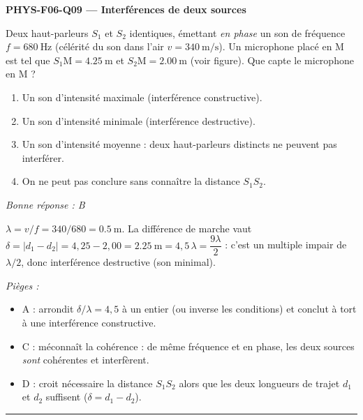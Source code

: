 \documentclass[11pt,a4paper]{article}
\begin{document}
\noindent\textbf{PHYS-F06-Q09 --- Interférences de deux sources}\par
Deux haut-parleurs $S_1$ et $S_2$ identiques, émettant \emph{en phase} un son de fréquence $f = \qty{680}{\hertz}$ (célérité du son dans l'air $v = \qty{340}{\metre\per\second}$). Un microphone placé en M est tel que $S_1\text{M} = \qty{4.25}{\metre}$ et $S_2\text{M} = \qty{2.00}{\metre}$ (voir figure). Que capte le microphone en M ?
\begin{center}
\end{center}
\begin{enumerate}[label=\Alph*)]
\item Un son d'intensité maximale (interférence constructive).
\item Un son d'intensité minimale (interférence destructive).
\item Un son d'intensité moyenne : deux haut-parleurs distincts ne peuvent pas interférer.
\item On ne peut pas conclure sans connaître la distance $S_1S_2$.
\end{enumerate}
\textit{Bonne réponse : B}\par
$\lambda = v/f = 340/680 = \qty{0.5}{\metre}$. La différence de marche vaut $\delta = |d_1 - d_2| = 4{,}25 - 2{,}00 = \qty{2.25}{\metre} = 4{,}5\,\lambda = \dfrac{9\lambda}{2}$ : c'est un multiple impair de $\lambda/2$, donc interférence destructive (son minimal).\par
\textit{Pièges :}
\begin{itemize}
\item A : arrondit $\delta/\lambda = 4{,}5$ à un entier (ou inverse les conditions) et conclut à tort à une interférence constructive.
\item C : méconnaît la cohérence : de même fréquence et en phase, les deux sources \emph{sont} cohérentes et interfèrent.
\item D : croit nécessaire la distance $S_1S_2$ alors que les deux longueurs de trajet $d_1$ et $d_2$ suffisent ($\delta = d_1 - d_2$).
\end{itemize}
\vspace{8pt}\hrule\vspace{8pt}
\end{document}
